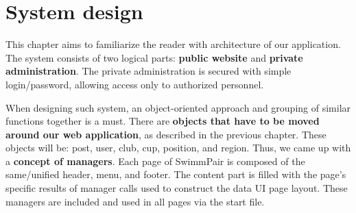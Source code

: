 \chapter{System design}
This chapter aims to familiarize the reader with architecture of our application. The system consists of two logical parts: \textbf{public website} and \textbf{private administration}. The private administration is secured with simple login/password, allowing access only to authorized personnel.
\par
When designing such system, an object-oriented approach and grouping of similar functions together is a must. There are \textbf{objects that have to be moved around our web application}, as described in the previous chapter. These objects will be: post, user, club, cup, position, and region. Thus, we came up with a \textbf{concept of managers}. Each page of SwimmPair is composed of the same/unified header, menu, and footer. The content part is filled with the page’s specific results of manager calls used to construct the data UI page layout. These managers are included and used in all pages via the start file.

